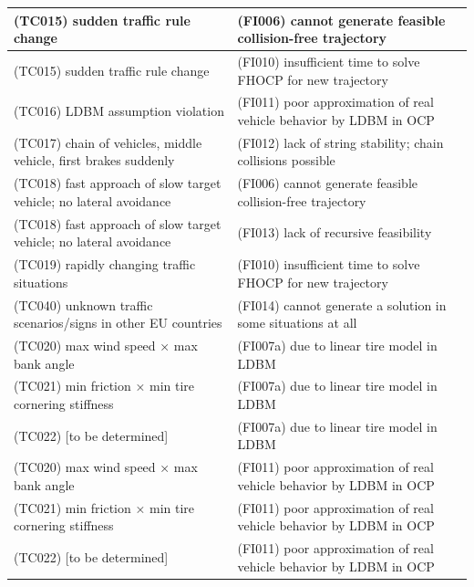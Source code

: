 \begin{longtable}{|p{8cm}|p{8cm}|}
\cellcolor{cYellow}(TC015) sudden traffic rule change& \cellcolor{cBlue}(FI006) cannot generate feasible collision-free trajectory\\\hline
\cellcolor{cYellow}(TC015) sudden traffic rule change& \cellcolor{cBlue}(FI010) insufficient time to solve FHOCP for new trajectory\\\hline
\cellcolor{cViolet}(TC016) LDBM assumption violation& \cellcolor{cBlue}(FI011) poor approximation of real vehicle behavior by LDBM in OCP\\\hline
\cellcolor{cGreen}(TC017) chain of vehicles, middle vehicle, first brakes suddenly& \cellcolor{cBlue}(FI012) lack of string stability; chain collisions possible\\\hline
\cellcolor{cGreen}(TC018) fast approach of slow target vehicle; no lateral avoidance& \cellcolor{cBlue}(FI006) cannot generate feasible collision-free trajectory\\\hline
\cellcolor{cGreen}(TC018) fast approach of slow target vehicle; no lateral avoidance& \cellcolor{cBlue}(FI013) lack of recursive feasibility\\\hline
\cellcolor{cGreen}(TC019) rapidly changing traffic situations& \cellcolor{cBlue}(FI010) insufficient time to solve FHOCP for new trajectory\\\hline
\cellcolor{cYellow}(TC040) unknown traffic scenarios/signs in other EU countries& \cellcolor{cBlue}(FI014) cannot generate a solution in some situations at all\\\hline
\cellcolor{cRed}(TC020) max wind speed × max bank angle& \cellcolor{cBlue}(FI007a) due to linear tire model in LDBM\\\hline
\cellcolor{cRed}(TC021) min friction × min tire cornering stiffness& \cellcolor{cBlue}(FI007a) due to linear tire model in LDBM\\\hline
\cellcolor{cRed}(TC022) [to be determined]& \cellcolor{cBlue}(FI007a) due to linear tire model in LDBM\\\hline
\cellcolor{cRed}(TC020) max wind speed × max bank angle& \cellcolor{cBlue}(FI011) poor approximation of real vehicle behavior by LDBM in OCP\\\hline
\cellcolor{cRed}(TC021) min friction × min tire cornering stiffness& \cellcolor{cBlue}(FI011) poor approximation of real vehicle behavior by LDBM in OCP\\\hline
\cellcolor{cRed}(TC022) [to be determined]& \cellcolor{cBlue}(FI011) poor approximation of real vehicle behavior by LDBM in OCP\\\hline

\end{longtable}
